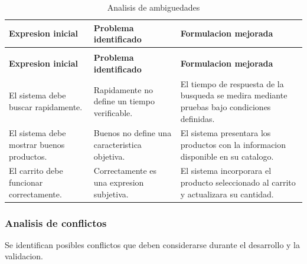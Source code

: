 \documentclass[12pt,a4paper]{article}
\renewcommand{\arraystretch}{1.17}
\begin{document}
\begingroup
\footnotesize
\setlength{\tabcolsep}{3pt}
\renewcommand{\arraystretch}{1.25}
\begin{longtable}{|>{\raggedright\arraybackslash}p{2.65cm}|>{\raggedright\arraybackslash}p{6.05cm}|>{\raggedright\arraybackslash}p{5.65cm}|}
\caption{Analisis de ambiguedades}\\
\hline
\textbf{Expresion inicial} &
\textbf{Problema identificado} &
\textbf{Formulacion mejorada} \\
\hline
\endfirsthead
\multicolumn{3}{c}{\textit{Continuación: Analisis de ambiguedades}}\\
\hline
\textbf{Expresion inicial} &
\textbf{Problema identificado} &
\textbf{Formulacion mejorada} \\
\hline
\endhead
El sistema debe buscar rapidamente. &
Rapidamente no define un tiempo verificable. &
El tiempo de respuesta de la busqueda se medira
mediante pruebas bajo condiciones definidas. \\
\hline
El sistema debe mostrar buenos productos. &
Buenos no define una caracteristica objetiva. &
El sistema presentara los productos con la
informacion disponible en su catalogo. \\
\hline
El carrito debe funcionar correctamente. &
Correctamente es una expresion subjetiva. &
El sistema incorporara el producto seleccionado
al carrito y actualizara su cantidad. \\
\hline
\end{longtable}
\endgroup

\subsubsection{Analisis de conflictos}

Se identifican posibles conflictos que deben
considerarse durante el desarrollo y la validacion.
\end{document}
